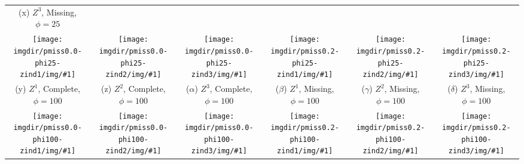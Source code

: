{\begin{tabular}{cccccc}
    {\tiny (x) $Z^3$, Missing,  $\phi=25$} \\
    \texttt{[image: \\imgdir/pmiss0.0-phi25-zind1/img/\#1]} &
    \texttt{[image: \\imgdir/pmiss0.0-phi25-zind2/img/\#1]} &
    \texttt{[image: \\imgdir/pmiss0.0-phi25-zind3/img/\#1]} &
    \texttt{[image: \\imgdir/pmiss0.2-phi25-zind1/img/\#1]} &
    \texttt{[image: \\imgdir/pmiss0.2-phi25-zind2/img/\#1]} &
    \texttt{[image: \\imgdir/pmiss0.2-phi25-zind3/img/\#1]} \\
    {\tiny (y) $Z^1$, Complete, $\phi=100$} &
    {\tiny (z) $Z^2$, Complete, $\phi=100$} &
    {\tiny ($\alpha$) $Z^3$, Complete, $\phi=100$} &
    {\tiny ($\beta$) $Z^1$, Missing,  $\phi=100$} &
    {\tiny ($\gamma$) $Z^2$, Missing,  $\phi=100$} &
    {\tiny ($\delta$) $Z^3$, Missing,  $\phi=100$} \\
    \texttt{[image: \\imgdir/pmiss0.0-phi100-zind1/img/\#1]} &
    \texttt{[image: \\imgdir/pmiss0.0-phi100-zind2/img/\#1]} &
    \texttt{[image: \\imgdir/pmiss0.0-phi100-zind3/img/\#1]} &
    \texttt{[image: \\imgdir/pmiss0.2-phi100-zind1/img/\#1]} &
    \texttt{[image: \\imgdir/pmiss0.2-phi100-zind2/img/\#1]} &
    \texttt{[image: \\imgdir/pmiss0.2-phi100-zind3/img/\#1]} \\
  \end{tabular}
}

